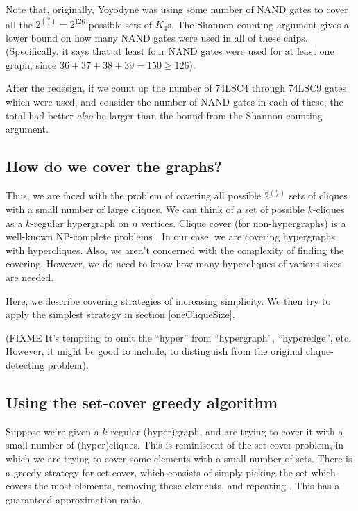 \documentclass[12pt]{article}
\theoremstyle{definition}
\begin{document}
Note that, originally, Yoyodyne was using some number of NAND gates to
cover all the $2^{9 \choose 4} = 2^{126}$ possible sets of $K_4$s.
The Shannon counting
argument gives a lower bound on how many NAND gates were used in all of
these chips. (Specifically, it says that at least four NAND gates
were used for at least one graph, since $36+37+38+39 = 150 \ge 126$).

After the redesign, if 
we count up the number of 74LSC4 through 74LSC9 gates which were used,
and consider the number of NAND gates in each
of these, the total had better {\em also} be larger than the bound from
the Shannon counting argument.

\subsection{How do we cover the graphs?}

Thus, we are faced with the problem of covering all possible $2^{n \choose k}$
sets of cliques with a small number of large cliques.
We can think of a set of possible $k$-cliques as
a $k$-regular hypergraph on $n$ vertices. Clique cover (for non-hypergraphs)
is a well-known NP-complete problems \cite{karp1972reducibility}.
In our case, we are covering hypergraphs with hypercliques. Also,
we aren't concerned with the complexity of finding the
covering. However, we do need to know how many hypercliques of various sizes are
needed.

Here, we describe covering strategies of increasing simplicity. We then
try to apply the simplest strategy in section \ref{oneCliqueSize}.

(FIXME It's tempting to omit the ``hyper'' from
``hypergraph'', ``hyperedge'', etc. However, it might be good to include,
to distinguish from the original clique-detecting problem).

\subsection{Using the set-cover greedy algorithm}

Suppose we're given a $k$-regular (hyper)graph, and are trying to cover it
with a small number of (hyper)cliques. This is reminiscent of the
set cover problem, in which we are trying to cover some elements with
a small number of sets.  There is a greedy
strategy for set-cover, which consists
of simply picking the set which covers the most elements, removing those
elements, and repeating \cite{chvatal1979greedy}.
This has a guaranteed approximation ratio.
\end{document}
